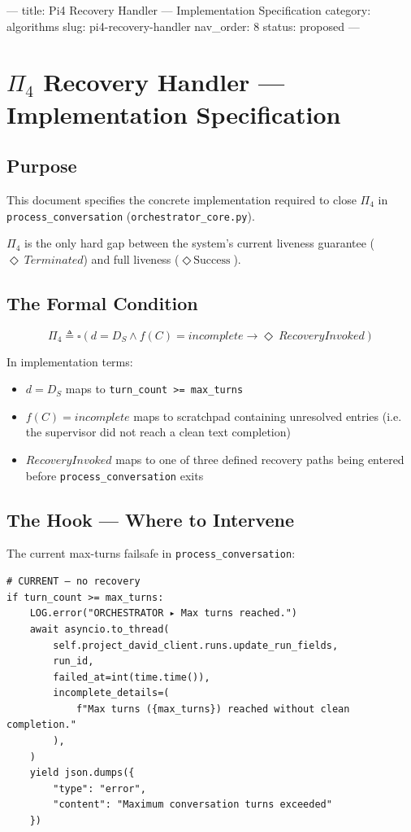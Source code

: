 ---
title: Pi4 Recovery Handler — Implementation Specification
category: algorithms
slug: pi4-recovery-handler
nav_order: 8
status: proposed
---

\section{$\Pi_4$ Recovery Handler — Implementation Specification}

\subsection*{Purpose}

This document specifies the concrete implementation required to close $\Pi_4$
in \texttt{process\_conversation} (\texttt{orchestrator\_core.py}).

$\Pi_4$ is the only hard gap between the system's current liveness guarantee
($\Diamond\ Terminated$) and full liveness ($\Diamond\ \text{Success}$).

\subsection*{The Formal Condition}

\[ \Pi_4 \triangleq \square \left( d = D_S \wedge f(C) = incomplete \rightarrow \Diamond\ RecoveryInvoked \right) \]

In implementation terms:

\begin{itemize}
  \item $d = D_S$ maps to \texttt{turn\_count >= max\_turns}
  \item $f(C) = incomplete$ maps to scratchpad containing unresolved entries
        (i.e. the supervisor did not reach a clean text completion)
  \item $RecoveryInvoked$ maps to one of three defined recovery paths
        being entered before \texttt{process\_conversation} exits
\end{itemize}

\subsection*{The Hook — Where to Intervene}

The current max-turns failsafe in \texttt{process\_conversation}:

\begin{verbatim}
# CURRENT — no recovery
if turn_count >= max_turns:
    LOG.error("ORCHESTRATOR ▸ Max turns reached.")
    await asyncio.to_thread(
        self.project_david_client.runs.update_run_fields,
        run_id,
        failed_at=int(time.time()),
        incomplete_details=(
            f"Max turns ({max_turns}) reached without clean completion."
        ),
    )
    yield json.dumps({
        "type": "error",
        "content": "Maximum conversation turns exceeded"
    })
\end{verbatim}

